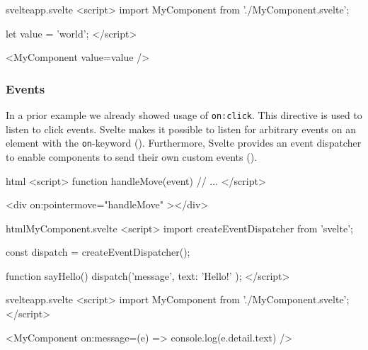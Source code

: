 \begin{listing}[h!]
\begin{myminted}{svelte}{app.svelte}
<script>
  import MyComponent from './MyComponent.svelte';

  let value = 'world';
</script>

<MyComponent value={value} />
\end{myminted}
\caption{Example usage of a custom Svelte component.}
\label{fig:svelte-component-usage}
\end{listing}

\subsubsection{Events}

In a prior example we already showed usage of \texttt{on:click}. This directive is used to listen to click events. Svelte makes it possible to listen for arbitrary events on an element with the \texttt{on}-keyword (). Furthermore, Svelte provides an event dispatcher to enable components to send their own custom events ().

\begin{listing}[h!]
\begin{myminted}[highlightlines={7}]{html}{}
<script>
  function handleMove(event) {
    // ...
  }
</script>

<div on:pointermove="{handleMove}" ></div>
\end{myminted}
\caption{Usage of the \texttt{on:}-directive to listen to \texttt{pointermove} events.}
\label{fig:svelte-on-directive}
\end{listing}


\begin{listing}[h!]
\begin{myminted}{html}{MyComponent.svelte}
<script>
  import { createEventDispatcher } from 'svelte';

  const dispatch = createEventDispatcher();

  function sayHello() {
    dispatch('message', { text: 'Hello!' });
  }
</script>
\end{myminted}
\begin{myminted}{svelte}{app.svelte}
<script>
  import MyComponent from './MyComponent.svelte';
</script>

<MyComponent on:message={(e) => console.log(e.detail.text)} />
\end{myminted}
\caption{Usage of the event dispatcher to send custom events.}
\label{fig:svelte-custom-event}
\end{listing}

